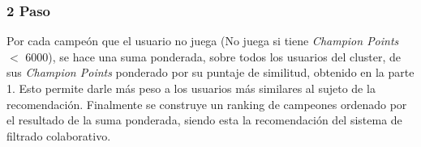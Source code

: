 \documentclass[letterpaper,11pt, spanish]{article}
\begin{document}
\subsubsection{2 Paso}

Por cada campeón que el usuario no juega (No juega si tiene \textit{Champion Points} $<$ 6000), se hace una suma ponderada, sobre todos los usuarios del cluster, de sus \textit{Champion Points} ponderado por su puntaje de similitud, obtenido en la parte 1. Esto permite darle más peso a los usuarios más similares al sujeto de la recomendación. Finalmente se construye un ranking de campeones ordenado por el resultado de la suma ponderada, siendo esta la recomendación del sistema de filtrado colaborativo. 
\end{document}
